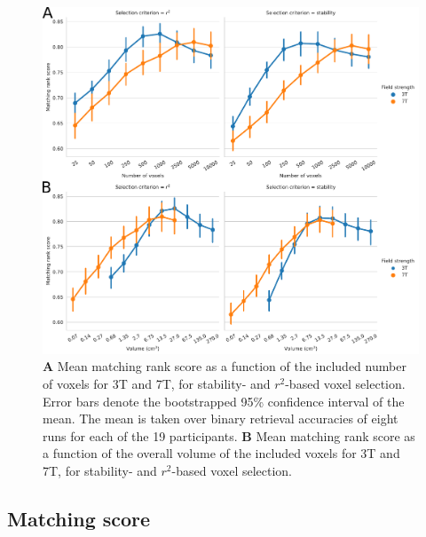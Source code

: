 \begin{figure}
  \centering
    \includegraphics[width=\linewidth]{pics/rank.pdf}
	
  \caption{\textbf{A} Mean matching rank score as a function of the included number
  of voxels for 3T and 7T, for stability- and $r^2$-based voxel selection.
  Error bars denote the bootstrapped 95\% confidence interval of the mean. The
  mean is taken over binary retrieval accuracies of eight runs for each of the
  19 participants. \textbf{B} Mean matching rank score as a function of the overall
volume of the included voxels for 3T and 7T, for stability- and
$r^2$-based voxel selection.}

 \label{fig:matching_score}
\end{figure}

\subsection*{Matching score}

